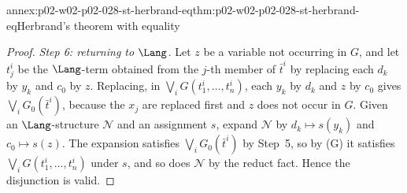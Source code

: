 \begin{annexitem}{annex:p02-w02-p02-028-st-herbrand-eq}{thm:p02-w02-p02-028-st-herbrand-eq}{Herbrand's theorem with equality}
\begin{proof}
\emph{Step 6: returning to \(\Lang\).}  Let \(z\) be a variable not occurring
in \(G\), and let \(t^i_j\) be the \(\Lang\)-term obtained from the
\(j\)-th member of \(\bar t^i\) by replacing each \(d_k\) by \(y_k\) and
\(c_0\) by \(z\).  Replacing, in \(\bigvee_iG(t^i_1,\ldots,t^i_n)\), each
\(y_k\) by \(d_k\) and \(z\) by \(c_0\) gives \(\bigvee_iG_0(\bar t^i)\),
because the \(x_j\) are replaced first and \(z\) does not occur in \(G\).  Given
an \(\Lang\)-structure \(\mathcal N\) and an assignment \(s\), expand
\(\mathcal N\) by \(d_k\mapsto s(y_k)\) and \(c_0\mapsto s(z)\).  The
expansion satisfies \(\bigvee_iG_0(\bar t^i)\) by Step~5, so by (G) it
satisfies \(\bigvee_iG(t^i_1,\ldots,t^i_n)\) under \(s\), and so does
\(\mathcal N\) by the reduct fact.  Hence the disjunction is valid.
\end{proof}
\end{annexitem}

